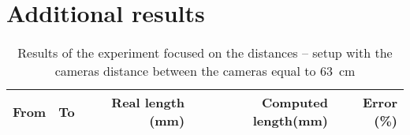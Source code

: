 \chapter{Additional results}

\begin{table}[h!]
\centering
\begin{tabular}{|r|r|r|r|r|}
\hline
From    & To    & Real length (mm) & Computed length(mm) & Error (\%) \\
\hline
\hline

\hline
\end{tabular}
\caption{Results of the experiment focused on the distances -- setup with the cameras distance between the cameras equal to 63~cm}
\label{table:distances-second}
\end{table}
